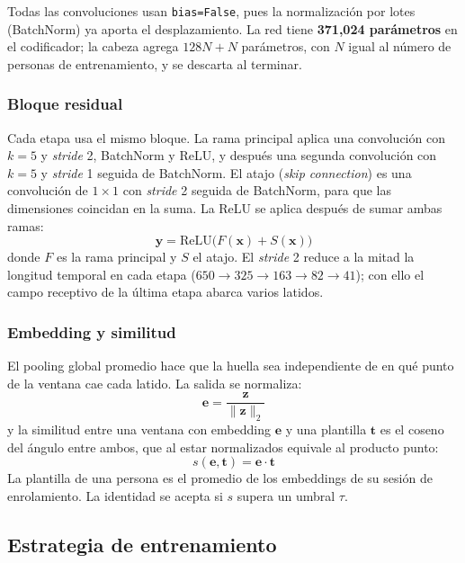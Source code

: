 Todas las convoluciones usan \texttt{bias=False}, pues la normalización por lotes (BatchNorm) ya aporta el desplazamiento. La red tiene \textbf{371{,}024 parámetros} en el codificador; la cabeza agrega $128N + N$ parámetros, con $N$ igual al número de personas de entrenamiento, y se descarta al terminar.

\subsubsection{Bloque residual}

Cada etapa usa el mismo bloque. La rama principal aplica una convolución con $k=5$ y \emph{stride} 2, BatchNorm y ReLU, y después una segunda convolución con $k=5$ y \emph{stride} 1 seguida de BatchNorm. El atajo (\emph{skip connection}) es una convolución de $1\times1$ con \emph{stride} 2 seguida de BatchNorm, para que las dimensiones coincidan en la suma. La ReLU se aplica después de sumar ambas ramas:
\begin{equation}
  \mathbf{y} = \mathrm{ReLU}\big(F(\mathbf{x}) + S(\mathbf{x})\big)
\end{equation}
donde $F$ es la rama principal y $S$ el atajo. El \emph{stride} 2 reduce a la mitad la longitud temporal en cada etapa ($650 \rightarrow 325 \rightarrow 163 \rightarrow 82 \rightarrow 41$); con ello el campo receptivo de la última etapa abarca varios latidos.

\subsubsection{Embedding y similitud}

El pooling global promedio hace que la huella sea independiente de en qué punto de la ventana cae cada latido. La salida se normaliza:
\begin{equation}
  \mathbf{e} = \frac{\mathbf{z}}{\lVert \mathbf{z} \rVert_2}
\end{equation}
y la similitud entre una ventana con embedding $\mathbf{e}$ y una plantilla $\mathbf{t}$ es el coseno del ángulo entre ambos, que al estar normalizados equivale al producto punto:
\begin{equation}
  s(\mathbf{e}, \mathbf{t}) = \mathbf{e} \cdot \mathbf{t}
\end{equation}
La plantilla de una persona es el promedio de los embeddings de su sesión de enrolamiento. La identidad se acepta si $s$ supera un umbral $\tau$.

\subsection{Estrategia de entrenamiento}


